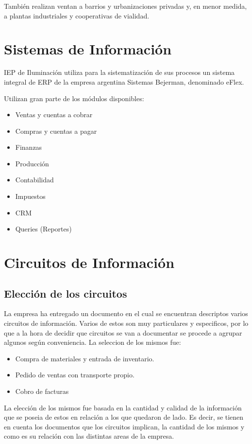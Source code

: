 Tambi\'en realizan ventan a barrios y urbanizaciones privadas y, en menor medida, a plantas industriales y cooperativas de vialidad.

\section{Sistemas de Informaci\'on}

IEP de Iluminaci\'on utiliza para la sistematizaci\'on de sus procesos un sistema integral de ERP de la empresa argentina Sistemas Bejerman, denominado eFlex.

Utilizan gran parte de los m\'odulos disponibles:

\begin{itemize}
\item Ventas y cuentas a cobrar
\item Compras y cuentas a pagar
\item Finanzas
\item Producci\'on
\item Contabilidad
\item Impuestos
\item CRM
\item Queries (Reportes)
\end{itemize}

\section{ Circuitos de Informaci\'on}
\subsection{ Elecci\'on de los circuitos}

La empresa ha entregado un documento en el cual se encuentran descriptos varios circuitos de informaci\'on. Varios de estos son muy particulares y especificos, por lo que a la hora de decidir que circuitos se van a documentar se procede a agrupar algunos seg\'un conveniencia.
La seleccion de los mismos fue:
\begin{itemize}
\item Compra de materiales y entrada de inventario.
\item Pedido de ventas con transporte propio.
\item Cobro de facturas
\end{itemize}

La elecci\'on de los mismos fue basada en la cantidad y calidad de la informaci\'on que se poseia de estos en relaci\'on a los que quedaron de lado. Es decir, se tienen en cuenta los documentos que los circuitos implican, la cantidad de los mismos y como es su relaci\'on con las distintas areas de la empresa.
